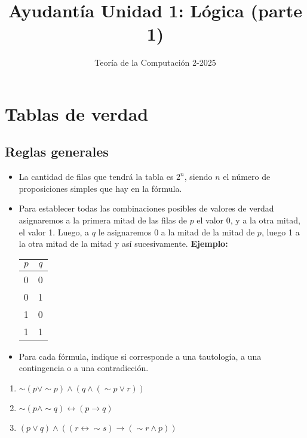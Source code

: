 \documentclass{article}
\begin{document}
\title{Ayudantía Unidad 1: Lógica (parte 1)}
\author{Teoría de la Computación 2-2025}
\date{}

\maketitle

\section{Tablas de verdad}

\subsection{Reglas generales}

\begin{itemize}
  \item La cantidad de filas que tendrá la tabla es $2^n$, siendo $n$ el número
        de proposiciones simples que hay en la fórmula.
  \item Para establecer todas las combinaciones posibles de valores de verdad
        asignaremos a la primera mitad de las filas de $p$ el valor 0, y a la
        otra mitad, el valor 1. Luego, a $q$ le asignaremos 0 a la mitad de la
        mitad de $p$, luego 1 a la otra mitad de la mitad y así sucesivamente.
        \textbf{Ejemplo:}
  \begin{table}[H]
    \centering
    \begin{tabular}{c|c}
      $p$ & $q$ \\
      \hline
      \hline
      0 & 0 \\
      0 & 1 \\
      1 & 0 \\
      1 & 1 \\
    \end{tabular}
  \end{table}
  \item Para cada fórmula, indique si corresponde a una tautología, a una
        contingencia o a una contradicción.
\end{itemize}

\begin{enumerate}
  \item $\sim (p \vee \sim p) \land (q \land(\sim p \vee r))$

  \item $\sim (p \land \sim q) \leftrightarrow (p \rightarrow q)$

  \item
        $(p \vee q) \land ((r \leftrightarrow \sim s) \rightarrow (\sim r \land
        p))$
\end{enumerate}
\end{document}
